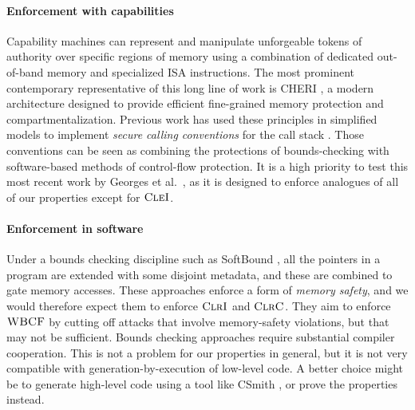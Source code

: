 \documentclass[10pt,conference]{ieeetran}%
\theoremstyle{definition}
\begin{document}
\paragraph*{Enforcement with capabilities}
Capability machines can represent and manipulate
unforgeable tokens of authority over specific regions of
memory using a combination of dedicated out-of-band memory and
specialized ISA instructions.
%
The most prominent contemporary representative of this long line of work is
CHERI \cite{DBLP:conf/sp/WatsonWNMACDDGL15}, a modern architecture designed to provide efficient fine-grained
memory protection and compartmentalization.
%
Previous work has used these principles in simplified models to implement
\emph{secure calling conventions} for the call
stack \cite{SkorstengaardLocal,SkorstengaardSTKJFP,Georges22:TempsDesCerises}. Those conventions can be seen as combining the
protections of bounds-checking with software-based methods of control-flow protection.
%
It is a high priority to test this most recent work by Georges et al.~\cite{Georges22:TempsDesCerises}, as it is designed
to enforce analogues of all of our properties except for \(\textnormal{\sc CleI}\).

\paragraph*{Enforcement in software}
%
Under a bounds checking discipline such as SoftBound \cite{NagarakatteZMZ09}, all the pointers
in a program are extended with some disjoint metadata, and these are combined
to gate memory accesses. These approaches enforce a form of \emph{memory safety},
and we would therefore expect them to enforce \(\textnormal{\sc ClrI}\) and \(\textnormal{\sc ClrC}\). They aim
to enforce \(\textnormal{\sc WBCF}\) by cutting off attacks that involve memory-safety violations,
but that may not be sufficient.
Bounds checking approaches require substantial compiler cooperation. This is not a
problem for our properties in general, but it is not very compatible with
generation-by-execution of low-level code. A better choice might be to generate
high-level code using a tool like CSmith \cite{DBLP:conf/pldi/YangCER11}, or prove the properties instead.
\end{document}
